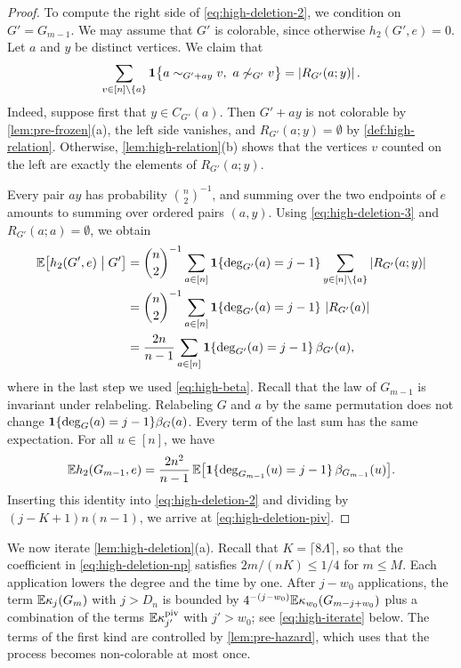 \begin{proof}
To compute the right side of \eqref{eq:high-deletion-2}, we condition on $G' = G_{m - 1}$. We may assume that $G'$ is colorable, since otherwise $h_2(G', e) = 0$. Let $a$ and $y$ be distinct vertices. We claim that
\begin{equation}\label{eq:high-deletion-3}
\sum_{v \in [n] \setminus \{a\}} \mathbf 1 \bigl\{ a \sim_{G' + ay} v, \ a \not \sim_{G'} v \bigr\} = \left|R_{G'}(a; y)\right|.
\end{equation}
Indeed, suppose first that $y \in C_{G'}(a)$. Then $G' + ay$ is not colorable by \cref{lem:pre-frozen}(a), the left side vanishes, and $R_{G'}(a; y) = \emptyset$ by \cref{def:high-relation}. Otherwise, \cref{lem:high-relation}(b) shows that the vertices $v$ counted on the left are exactly the elements of $R_{G'}(a; y)$.

Every pair $ay$ has probability $\binom{n}{2}^{-1}$, and summing over the two endpoints of $e$ amounts to summing over ordered pairs $(a, y)$. Using \eqref{eq:high-deletion-3} and $R_{G'}(a; a) = \emptyset$, we obtain
\[
\begin{split}
\mathbb E \bigl[ h_2(G', e) \bigm| G' \bigr] &= \binom{n}{2}^{-1} \sum_{a \in [n]} \mathbf 1 \{ \deg_{G'}(a) = j - 1 \} \sum_{y \in [n] \setminus \{a\}} \left|R_{G'}(a; y)\right|\\
&= \binom{n}{2}^{-1} \sum_{a \in [n]} \mathbf 1 \{ \deg_{G'}(a) = j - 1 \} \, \left|R_{G'}(a)\right|\\
&= \frac{2n}{n - 1} \sum_{a \in [n]} \mathbf 1 \{ \deg_{G'}(a) = j - 1 \} \, \beta_{G'}(a),
\end{split}
\]
where in the last step we used \eqref{eq:high-beta}. Recall that the law of $G_{m - 1}$ is invariant under relabeling. Relabeling $G$ and $a$ by the same permutation does not change $\mathbf 1 \{ \deg_G(a) = j - 1 \} \beta_G(a)$. Every term of the last sum has the same expectation. For all $u \in [n]$, we have
\[
\mathbb E h_2(G_{m - 1}, e) = \frac{2n^2}{n - 1} \, \mathbb E \bigl[ \mathbf 1 \{ \deg_{G_{m - 1}}(u) = j - 1 \} \, \beta_{G_{m - 1}}(u) \bigr].
\]
Inserting this identity into \eqref{eq:high-deletion-2} and dividing by $(j - K + 1) n (n - 1)$, we arrive at \eqref{eq:high-deletion-piv}.
\end{proof}

We now iterate \cref{lem:high-deletion}(a). Recall that $K = \lceil 8 \Lambda \rceil$, so that the coefficient in \eqref{eq:high-deletion-np} satisfies $2m/(nK) \le 1/4$ for $m \le M$. Each application lowers the degree and the time by one. After $j - w_0$ applications, the term $\mathbb E \kappa_j(G_m)$ with $j > D_n$ is bounded by $4^{-(j - w_0)} \mathbb E \kappa_{w_0}(G_{m - j + w_0})$ plus a combination of the terms $\mathbb E \kappa_{j'}^{\rm piv}$ with $j' > w_0$; see \eqref{eq:high-iterate} below. The terms of the first kind are controlled by \cref{lem:pre-hazard}, which uses that the process becomes non-colorable at most once.

